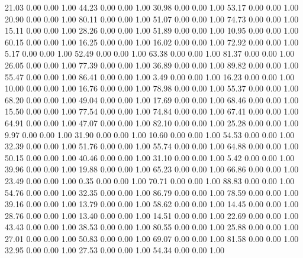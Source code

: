    21.03   0.00   0.00   1.00
   44.23   0.00   0.00   1.00
   30.98   0.00   0.00   1.00
   53.17   0.00   0.00   1.00
   20.90   0.00   0.00   1.00
   80.11   0.00   0.00   1.00
   51.07   0.00   0.00   1.00
   74.73   0.00   0.00   1.00
   15.11   0.00   0.00   1.00
   28.26   0.00   0.00   1.00
   51.89   0.00   0.00   1.00
   10.95   0.00   0.00   1.00
   60.15   0.00   0.00   1.00
   16.25   0.00   0.00   1.00
   16.02   0.00   0.00   1.00
   72.92   0.00   0.00   1.00
    5.17   0.00   0.00   1.00
   52.49   0.00   0.00   1.00
   63.38   0.00   0.00   1.00
   81.37   0.00   0.00   1.00
   26.05   0.00   0.00   1.00
   77.39   0.00   0.00   1.00
   36.89   0.00   0.00   1.00
   89.82   0.00   0.00   1.00
   55.47   0.00   0.00   1.00
   86.41   0.00   0.00   1.00
    3.49   0.00   0.00   1.00
   16.23   0.00   0.00   1.00
   10.00   0.00   0.00   1.00
   16.76   0.00   0.00   1.00
   78.98   0.00   0.00   1.00
   55.37   0.00   0.00   1.00
   68.20   0.00   0.00   1.00
   49.04   0.00   0.00   1.00
   17.69   0.00   0.00   1.00
   68.46   0.00   0.00   1.00
   15.50   0.00   0.00   1.00
   77.54   0.00   0.00   1.00
   74.84   0.00   0.00   1.00
   67.41   0.00   0.00   1.00
   64.91   0.00   0.00   1.00
   47.07   0.00   0.00   1.00
   82.10   0.00   0.00   1.00
   25.28   0.00   0.00   1.00
    9.97   0.00   0.00   1.00
   31.90   0.00   0.00   1.00
   10.60   0.00   0.00   1.00
   54.53   0.00   0.00   1.00
   32.39   0.00   0.00   1.00
   51.76   0.00   0.00   1.00
   55.74   0.00   0.00   1.00
   64.88   0.00   0.00   1.00
   50.15   0.00   0.00   1.00
   40.46   0.00   0.00   1.00
   31.10   0.00   0.00   1.00
    5.42   0.00   0.00   1.00
   39.96   0.00   0.00   1.00
   19.88   0.00   0.00   1.00
   65.23   0.00   0.00   1.00
   66.86   0.00   0.00   1.00
   23.49   0.00   0.00   1.00
    0.35   0.00   0.00   1.00
   70.71   0.00   0.00   1.00
   88.83   0.00   0.00   1.00
   54.76   0.00   0.00   1.00
   32.35   0.00   0.00   1.00
   86.79   0.00   0.00   1.00
   78.59   0.00   0.00   1.00
   39.16   0.00   0.00   1.00
   13.79   0.00   0.00   1.00
   58.62   0.00   0.00   1.00
   14.45   0.00   0.00   1.00
   28.76   0.00   0.00   1.00
   13.40   0.00   0.00   1.00
   14.51   0.00   0.00   1.00
   22.69   0.00   0.00   1.00
   43.43   0.00   0.00   1.00
   38.53   0.00   0.00   1.00
   80.55   0.00   0.00   1.00
   25.88   0.00   0.00   1.00
   27.01   0.00   0.00   1.00
   50.83   0.00   0.00   1.00
   69.07   0.00   0.00   1.00
   81.58   0.00   0.00   1.00
   32.95   0.00   0.00   1.00
   27.53   0.00   0.00   1.00
   54.34   0.00   0.00   1.00
